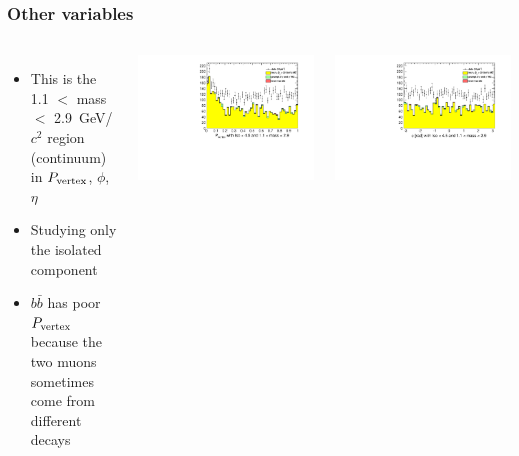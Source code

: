 \documentclass[compress]{beamer}
\newcommand{\s}[1]{{\mbox{\scriptsize #1}}}
\begin{document}
\begin{frame}
\frametitle{Other variables}
\begin{columns}
\begin{itemize}
\item This is the 1.1 $<$ mass $<$ 2.9~GeV/$c^2$ region (continuum) in
  $P_\s{vertex}$, $\phi$, $\eta$
\item Studying only the isolated component
\item $b\bar{b}$ has poor $P_\s{vertex}$ because the two muons
  sometimes come from different decays
\end{itemize}

\includegraphics[width=\linewidth]{lowdimuon_vprob_midmass_isolated.pdf}

\includegraphics[width=\linewidth]{lowdimuon_phi_midmass_isolated.pdf}


\end{columns}
\end{frame}
\end{document}
